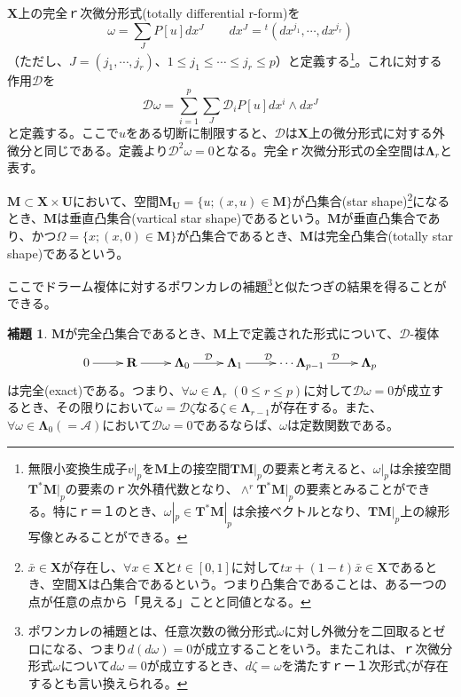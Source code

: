 \documentclass[a4paper, 11pt]{report}
\theoremstyle{definition}
\newtheorem{lemma}{補題}[section]
\begin{document}
 $\mathbf{X}$上の完全ｒ次微分形式(totally differential r-form)を
\begin{equation}
\omega = \sum _J P[u] dx^J\qquad dx^J = {}^t( dx^{j_1},\cdots, dx^{j_r} ) %
\end{equation}
（ただし、$J=(j_1,\cdots,j_r)$、$1\leq j_1\leq \cdots \leq j_r\leq p$）と定義する\footnote{無限小変換生成子$v|_p$を$\mathbf{M}$上の接空間$\mathbf{T}\mathbf{M}|_p$の要素と考えると、$\omega |_p$は余接空間$\mathbf{T}^*\mathbf{M}|_p$の要素のｒ次外積代数となり、$\wedge^{r} \mathbf{T}^*\mathbf{M}|_p$の要素とみることができる。特にｒ＝１のとき、$\omega|_p\in\mathbf{T}^*\mathbf{M}|_p$は余接ベクトルとなり、$\mathbf{T}\mathbf{M}|_p$上の線形写像とみることができる。}。これに対する作用$\mathcal{D}$を
\begin{equation*}
\mathcal{D} \omega = \sum _{i=1}^p \sum _J \mathcal{D}_i P[u] dx^i\wedge dx^J
\end{equation*}
と定義する。ここで$u$をある切断に制限すると、$\mathcal{D}$は$\mathbf{X}$上の微分形式に対する外微分と同じである。定義より$\mathcal{D}^2 \omega=0$となる。完全ｒ次微分形式の全空間は$\mathbf{\Lambda}_r$と表す。

 $\mathbf{M}\subset \mathbf{X}\times \mathbf{U}$において、空間$\mathbf{M}_\mathbf{U}=\{ u;(x,u)\in \mathbf{M} \}$が凸集合(star shape)\footnote{$\bar{x}\in \mathbf{X}$が存在し、$\forall x\in \mathbf{X}$と$t\in [0,1]$に対して$tx+(1-t)\bar{x}\in \mathbf{X}$であるとき、空間$\mathbf{X}$は凸集合であるという。つまり凸集合であることは、ある一つの点が任意の点から「見える」ことと同値となる。}になるとき、$\mathbf{M}$は垂直凸集合(vartical star shape)であるという。$\mathbf{M}$が垂直凸集合であり、かつ$\Omega=\{ x;(x,0)\in \mathbf{M} \}$が凸集合であるとき、$\mathbf{M}$は完全凸集合(totally star shape)であるという。

 ここでドラーム複体に対するポワンカレの補題\footnote{ポワンカレの補題とは、任意次数の微分形式$\omega$に対し外微分を二回取るとゼロになる、つまり$d(d\omega )=0$が成立することをいう。またこれは、ｒ次微分形式$\omega$について$d\omega =0$が成立するとき、$d\zeta =\omega$を満たすｒー１次形式$\zeta$が存在するとも言い換えられる。}と似たつぎの結果を得ることができる。

\begin{lemma}
 $\mathbf{M}$が完全凸集合であるとき、$\mathbf{M}$上で定義された形式について、$\mathcal{D}$-複体
\begin{align*}
\xymatrix{
0 \ar[r] &{\mathbf{R}} \ar[r] &{\mathbf{\Lambda}_0} \ar[r]^{\mathcal{D}} &{\mathbf{\Lambda}_1} \ar[r]^{\mathcal{D}} &{\cdots \mathbf{\Lambda}_{p-1}} \ar[r]^{\mathcal{D}} &{\mathbf{\Lambda}_p}
}
\end{align*}
は完全(exact)である。つまり、$\forall \omega\in \mathbf{\Lambda}_r\; (0\leq r\leq p)$に対して$\mathcal{D}\omega=0$が成立するとき、その限りにおいて$\omega=\mathcal{D}\zeta$なる$\zeta\in \mathbf{\Lambda}_{r-1}$が存在する。また、$\forall \omega\in \mathbf{\Lambda}_0(=\mathcal{A})$において$\mathcal{D}\omega=0$であるならば、$\omega$は定数関数である。
\end{lemma}
\end{document}
